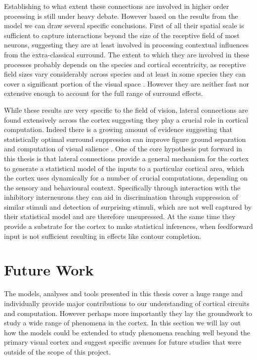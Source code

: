 Establishing to what extent these connections are involved in higher
order processing is still under heavy debate. However based on the
results from the model we can draw several specific conclusions. First
of all their spatial scale is sufficient to capture interactions
beyond the size of the receptive field of most neurons, suggesting
they are at least involved in processing contextual influences from
the extra-classical surround. The extent to which they are involved in
these processes probably depends on the species and cortical
eccentricity, as receptive field sizes vary considerably across
species and at least in some species they can cover a significant
portion of the visual space \citep{Bosking1997}. However they are
neither fast nor extensive enough to account for the full range of
surround effects.

While these results are very specific to the field of vision, lateral
connections are found extensively across the cortex suggesting they
play a crucial role in cortical computation. Indeed there is a growing
amount of evidence suggesting that statistically optimal surround
suppression can improve figure ground separation and computation of
visual salience \citep{Coen2012, Coen2015}. One of the core hypothesis
put forward in this thesis is that lateral connections provide a
general mechanism for the cortex to generate a statistical model of
the inputs to a particular cortical area, which the cortex uses
dynamically for a number of crucial computations, depending on the
sensory and behavioural context. Specifically through interaction with
the inhibitory interneurons they can aid in discrimination through
suppression of similar stimuli and detection of surprising stimuli,
which are not well captured by their statistical model and are
therefore unsupressed. At the same time they provide a substrate for
the cortex to make statistical inferences, when feedforward input is
not sufficient resulting in effects like contour completion.

\section{Future Work}

The models, analyses and tools presented in this thesis cover a huge
range and individually provide major contributions to our
understanding of cortical circuits and computation. However perhaps
more importantly they lay the groundwork to study a wide range of
phenomena in the cortex. In this section we will lay out how the
models could be extended to study phenomena reaching well beyond the
primary visual cortex and suggest specific avenues for future studies
that were outside of the scope of this project.

